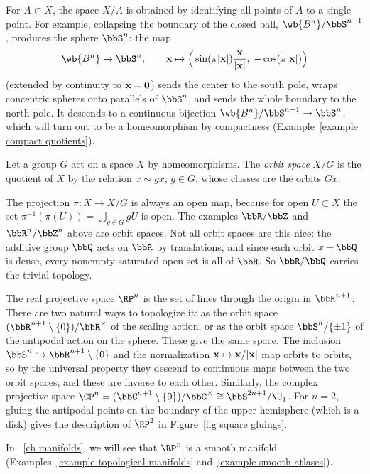 \begin{example}\label{example collapsing}
    For $A\subset X$, the space $X/A$ is obtained by identifying all points of $A$ to a single point. For example, collapsing the boundary of the closed ball, $\wb{B^n}/\bbS^{n-1}$, produces the sphere $\bbS^n$: the map
    \[\wb{B^n}\to\bbS^n,\qquad \bf{x}\mapsto\Big(\sin(\pi\lvert \bf{x}\rvert)\frac{\bf{x}}{\lvert \bf{x}\rvert},\;-\cos(\pi\lvert \bf{x}\rvert)\Big)\]
    (extended by continuity to $\bf{x}=0$) sends the center to the south pole, wraps concentric spheres onto parallels of $\bbS^n$, and sends the whole boundary to the north pole. It descends to a continuous bijection $\wb{B^n}/\bbS^{n-1}\to\bbS^n$, which will turn out to be a homeomorphism by compactness (Example~\ref{example compact quotients}).
\end{example}

\begin{defn}
    Let a group $G$ act on a space $X$ by homeomorphisms. The \emph{orbit space} $X/G$ is the quotient of $X$ by the relation $x\sim gx$, $g\in G$, whose classes are the orbits $Gx$.
\end{defn}

The projection $\pi:X\to X/G$ is always an open map, because for open $U\subset X$ the set $\pi^{-1}(\pi(U))=\bigcup_{g\in G}gU$ is open. The examples $\bbR/\bbZ$ and $\bbR^n/\bbZ^n$ above are orbit spaces. Not all orbit spaces are this nice: the additive group $\bbQ$ acts on $\bbR$ by translations, and since each orbit $x+\bbQ$ is dense, every nonempty saturated open set is all of $\bbR$. So $\bbR/\bbQ$ carries the trivial topology.

\begin{example}\label{example projective spaces}
    The real projective space $\RP^n$ is the set of lines through the origin in $\bbR^{n+1}$. There are two natural ways to topologize it: as the orbit space $(\bbR^{n+1}\setminus\{0\})/\bbR^\times$ of the scaling action, or as the orbit space $\bbS^n/\{\pm1\}$ of the antipodal action on the sphere. These give the same space. The inclusion $\bbS^n\hookrightarrow\bbR^{n+1}\setminus\{0\}$ and the normalization $\bf{x}\mapsto \bf{x}/\lvert \bf{x}\rvert$ map orbits to orbits, so by the universal property they descend to continuous maps between the two orbit spaces, and these are inverse to each other. Similarly, the complex projective space $\CP^n=(\bbC^{n+1}\setminus\{0\})/\bbC^\times\cong\bbS^{2n+1}/\U_1$. For $n=2$, gluing the antipodal points on the boundary of the upper hemisphere (which is a disk) gives the description of $\RP^2$ in Figure~\ref{fig square gluings}.
\end{example}
In \Chap~\ref{ch manifolds}, we will see that $\RP^n$ is a smooth manifold (Examples~\ref{example topological manifolds} and~\ref{example smooth atlases}).

